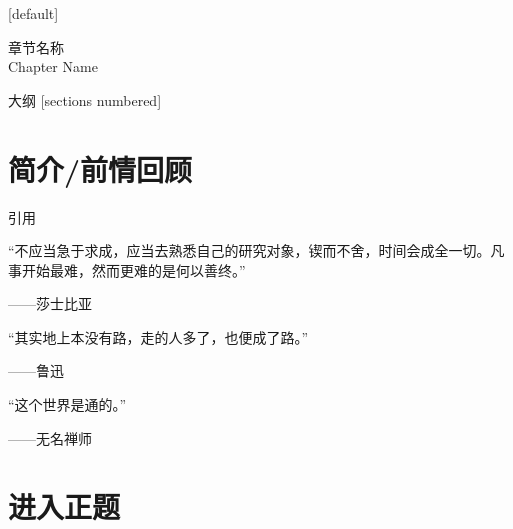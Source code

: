 \documentclass[colortheme=light,algorithm,pgfplots]{njubeamer}
\begin{document}
    
    \maketitle

{
    [default]
    
    \begin{standout}[第X章]
        章节名称\\
        Chapter Name
    \end{standout}
}



    \begin{frame}{大纲}
        [sections numbered]
        \tableofcontents
    \end{frame}

    \section{简介/前情回顾}

    \begin{frame}
        \begin{block}{引用}
            \begin{leftbar}
                “不应当急于求成，应当去熟悉自己的研究对象，锲而不舍，时间会成全一切。凡事开始最难，然而更难的是何以善终。”\par
                \raggedleft ------莎士比亚
            \end{leftbar}
            \begin{leftbar}
                “其实地上本没有路，走的人多了，也便成了路。”\par
                \raggedleft ------鲁迅
            \end{leftbar}
            \begin{leftbar}
                “这个世界是通的。”\par
                \raggedleft ------无名禅师
            \end{leftbar}
        \end{block}
    \end{frame}

    \section{进入正题}
\end{document}
